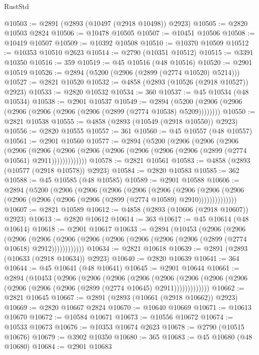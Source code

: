 \begin{lexlean}{RustStd}
\begin{coremodule}
@10503 := @2891 (@2893 (@10497 (@2918 @10498)) @2923)
@10505 := @2820 @10503 @2824
@10506 := @10478 @10505
@10507 := @10451 @10506
@10508 := @10419 @10507
@10509 := @10392 @10508
@10510 := @10370 @10509
@10512 := @10353 @10510 @2623
@10514 := @2790 (@10351 @10512)
@10515 := @3391 @10350
@10516 := 359
@10519 := @45 @10516 (@48 @10516)
@10520 := @2901 @10519
@10526 := @2894 (@5200 (@2906 (@2899 (@2774 @10520) @5214)))
@10527 := @2821 @10520
@10532 := @4858 (@2893 (@10526 (@2918 @10527)) @2923)
@10533 := @2820 @10532
@10534 := 360
@10537 := @45 @10534 (@48 @10534)
@10538 := @2901 @10537
@10549 := @2894 (@5200 (@2906 (@2906 (@2906 (@2906 (@2906 (@2906 (@2899 (@2774 @10538) @5209))))))))
@10550 := @2821 @10538
@10555 := @4858 (@2893 (@10549 (@2918 @10550)) @2923)
@10556 := @2820 @10555
@10557 := 361
@10560 := @45 @10557 (@48 @10557)
@10561 := @2901 @10560
@10577 := @2894
    (@5200
      (@2906
        (@2906
          (@2906
            (@2906
              (@2906
                (@2906 (@2906 (@2906 (@2906 (@2906 (@2906 (@2899 (@2774 @10561) @2911)))))))))))))
@10578 := @2821 @10561
@10583 := @4858 (@2893 (@10577 (@2918 @10578)) @2923)
@10584 := @2820 @10583
@10585 := 362
@10588 := @45 @10585 (@48 @10585)
@10589 := @2901 @10588
@10606 := @2894
    (@5200
      (@2906
        (@2906
          (@2906
            (@2906
              (@2906
                (@2906
                  (@2906
                    (@2906 (@2906 (@2906 (@2906 (@2906 (@2899 (@2774 @10589) @2910))))))))))))))
@10607 := @2821 @10589
@10612 := @4858 (@2893 (@10606 (@2918 @10607)) @2923)
@10613 := @2820 @10612
@10614 := 363
@10617 := @45 @10614 (@48 @10614)
@10618 := @2901 @10617
@10633 := @2894
    (@10453
      (@2906
        (@2906
          (@2906
            (@2906 (@2906 (@2906 (@2906 (@2906 (@2906 (@2906 (@2899 (@2774 @10618) @2912))))))))))))
@10634 := @2821 @10618
@10639 := @2891 (@2893 (@10633 (@2918 @10634)) @2923)
@10640 := @2820 @10639
@10641 := 364
@10644 := @45 @10641 (@48 @10641)
@10645 := @2901 @10644
@10661 := @2894
    (@10453
      (@2906
        (@2906
          (@2906
            (@2906
              (@2906
                (@2906 (@2906 (@2906 (@2906 (@2906 (@2906 (@2899 (@2774 @10645) @2911)))))))))))))
@10662 := @2821 @10645
@10667 := @2891 (@2893 (@10661 (@2918 @10662)) @2923)
@10669 := @2820 @10667 @2824
@10670 := @10640 @10669
@10671 := @10613 @10670
@10672 := @10584 @10671
@10673 := @10556 @10672
@10674 := @10533 @10673
@10676 := @10353 @10674 @2623
@10678 := @2790 (@10515 @10676)
@10679 := @3902 @10350
@10680 := 365
@10683 := @45 @10680 (@48 @10680)
@10684 := @2901 @10683

\end{coremodule}
\end{lexlean}
